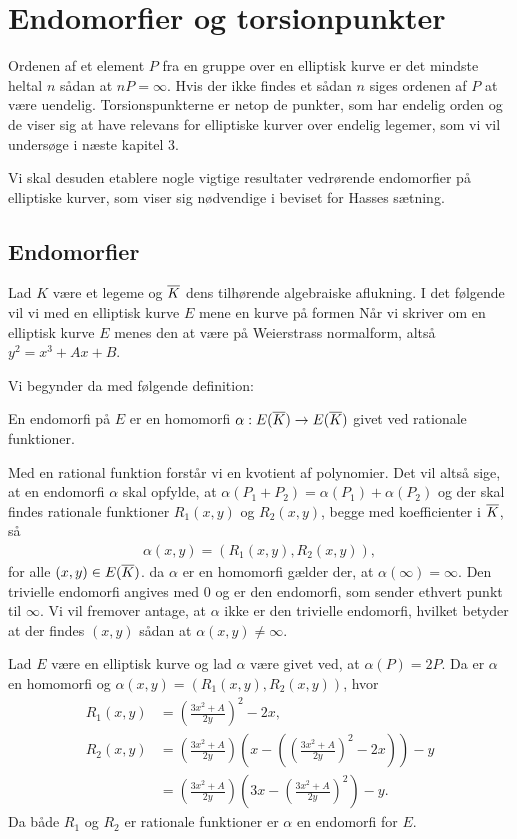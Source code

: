 \chapter{Endomorfier og torsionpunkter}

Ordenen af et element $P$ fra en gruppe over en elliptisk kurve er det mindste heltal $n$ sådan at $nP = \infty$. Hvis der ikke findes et sådan $n$ siges ordenen af $P$ at være uendelig. Torsionspunkterne er netop de punkter, som har endelig orden og de viser sig at have relevans for elliptiske kurver over endelig legemer, som vi vil undersøge i næste kapitel 3.

Vi skal desuden etablere nogle vigtige resultater vedrørende endomorfier på elliptiske kurver, som viser sig nødvendige i beviset for Hasses sætning.

\section{Endomorfier}
Lad $K$ være et legeme og $\overline{K}$ dens tilhørende algebraiske aflukning. I det følgende vil vi med en elliptisk kurve $E$ mene en kurve på formen Når vi skriver om en elliptisk kurve $E$ menes den at være på Weierstrass normalform, altså $y^2 = x^3 + Ax + B$. 

Vi begynder da med følgende definition:

\begin{definition}
En endomorfi på $E$ er en homomorfi $\alpha : E(\overline{K}) \to E(\overline{K})$ givet
ved rationale funktioner.
\end{definition}

Med en rational funktion forstår vi en kvotient af polynomier. Det vil altså sige, at 
en endomorfi $\alpha$ skal opfylde, at $\alpha(P_1 + P_2) = \alpha(P_1) + \alpha(P_2)$ 
og der skal findes rationale 
funktioner $R_1(x, y)$ og $R_2(x, y)$, begge med koefficienter i $\overline{K}$, så
\begin{align*}
	\alpha(x, y) = (R_1(x, y), R_2(x, y)),
\end{align*}
for alle $(x, y) \in E(\overline{K})$. da $\alpha$ er en homomorfi gælder der, at $\alpha(\infty)=\infty$. Den trivielle endomorfi angives med $0$ og er den endomorfi, som sender ethvert punkt til $\infty$. Vi vil fremover antage, at $\alpha$ ikke er den trivielle endomorfi, hvilket betyder at der findes $(x, y)$ sådan at $\alpha(x, y) \neq \infty$.

\begin{example}
Lad $E$ være en elliptisk kurve og lad $\alpha$ være givet ved, at $\alpha(P)=2P$. Da er $\alpha$ en homomorfi og
$\alpha(x, y) = (R_1(x, y), R_2(x, y))$, hvor
\begin{align*}
	R_1(x, y) &= \left( \frac{3x^2 + A}{2y} \right)^2 - 2x, \\
	R_2(x, y) &= \left( \frac{3x^2 + A}{2y} \right) \left(x - \left( \left( \frac{3x^2 + A}{2y} \right)^2 - 
	2x \right) \right) - y \\
	&= \left( \frac{3x^2 + A}{2y} \right) \left(3x - \left( \frac{3x^2 + A}{2y} \right)^2 \right) - y.
\end{align*}
Da både $R_1$ og $R_2$ er rationale funktioner er $\alpha$ en endomorfi for $E$.
\end{example}



